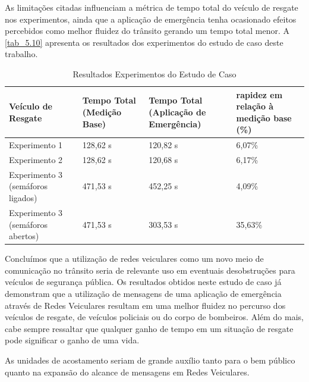 \documentclass[
12pt,				%
openright,			%
oneside,			%
a4paper,			%
brazil,				%
]{abntex2}
\begin{document}
	\par As limitações citadas influenciam a métrica de tempo total do veículo de resgate nos experimentos, ainda que a aplicação de emergência tenha ocasionado efeitos percebidos como  melhor fluidez do trânsito gerando um tempo total menor. A \autoref{tab_5.10} apresenta os resultados dos experimentos do estudo de caso deste trabalho.
	
	\begin{table}[H]
		\centering
		\renewcommand{\arraystretch}{1.5}
		\begin{tabular}{|p{3.5cm}|p{3.0cm}|p{3.1cm}|p{4.0cm}|}
			\hline
			\textbf{Veículo de \newline Resgate} & \textbf{Tempo Total} (Medição Base) & \textbf{Tempo Total} \newline (Aplicação de Emergência) & \textbf{rapidez em relação \newline à medição base} (\%) \\ \hline
			Experimento 1 & 128,62 s & 120,82 s & 6,07\% \\ \hline
			Experimento 2 & 128,62 s & 120,68 s & 6,17\% \\ \hline
			Experimento 3 \newline (semáforos ligados) & 471,53 s & 452,25 s & 4,09\% \\ \hline
			Experimento 3 \newline (semáforos abertos) & 471,53 s & 303,53 s & 35,63\% \\ \hline
		\end{tabular}
		\caption{Resultados Experimentos do Estudo de Caso}
		\label{tab_5.10}
	\end{table}

	\par Concluímos que a utilização de redes veiculares como um novo meio de comunicação no trânsito seria de relevante uso em eventuais desobstruções para veículos de segurança pública. Os resultados obtidos neste estudo de caso já demonstram que a utilização de mensagens de uma aplicação de emergência através de Redes Veiculares resultam em uma melhor fluidez no percurso dos veículos de resgate, de veículos policiais ou do corpo de bombeiros. Além do mais, cabe sempre ressaltar que qualquer ganho de tempo em um situação de resgate pode significar o ganho de uma vida.

	\par As unidades de acostamento seriam de grande auxílio tanto para o bem público quanto na expansão do alcance de mensagens em Redes Veiculares. 
\end{document}
